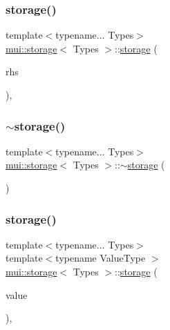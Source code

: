 \mbox{\label{structmui_1_1storage_a1c7e09bddc9b61b60864ea2a15ba711b}} 
\subsubsection{\texorpdfstring{storage()}{storage()}\hspace{0.1cm}{\footnotesize\ttfamily [3/5]}}
{\footnotesize\ttfamily template$<$typename... Types$>$ \\
\hyperlink{structmui_1_1storage}{mui\+::storage}$<$ Types $>$\+::\hyperlink{structmui_1_1storage}{storage} (\begin{DoxyParamCaption}\item[{\hyperlink{structmui_1_1storage}{storage}$<$ Types $>$ \&\&}]{rhs }\end{DoxyParamCaption})\hspace{0.3cm}{\ttfamily [inline]}, {\ttfamily [noexcept]}}

\mbox{\label{structmui_1_1storage_a232ca56659fdb43242c954686e976256}} 
\subsubsection{\texorpdfstring{$\sim$storage()}{~storage()}}
{\footnotesize\ttfamily template$<$typename... Types$>$ \\
\hyperlink{structmui_1_1storage}{mui\+::storage}$<$ Types $>$\+::$\sim$\hyperlink{structmui_1_1storage}{storage} (\begin{DoxyParamCaption}{ }\end{DoxyParamCaption})\hspace{0.3cm}{\ttfamily [inline]}}

\mbox{\label{structmui_1_1storage_a5cca4dff7c9484c9ef37987677345dcd}} 
\subsubsection{\texorpdfstring{storage()}{storage()}\hspace{0.1cm}{\footnotesize\ttfamily [4/5]}}
{\footnotesize\ttfamily template$<$typename... Types$>$ \\
template$<$typename Value\+Type $>$ \\
\hyperlink{structmui_1_1storage}{mui\+::storage}$<$ Types $>$\+::\hyperlink{structmui_1_1storage}{storage} (\begin{DoxyParamCaption}\item[{const Value\+Type \&}]{value }\end{DoxyParamCaption})\hspace{0.3cm}{\ttfamily [inline]}, {\ttfamily [explicit]}}

